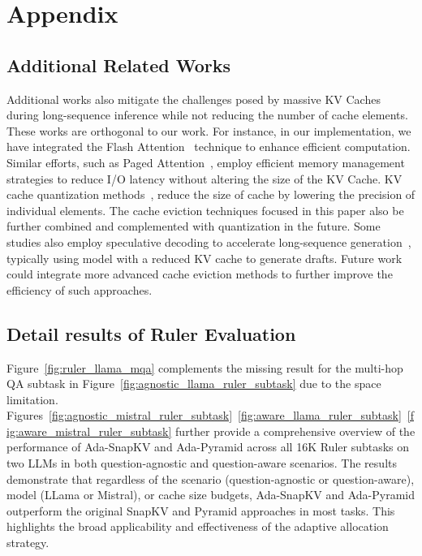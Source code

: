 \onecolumn
\newpage
{}
\appendix
\section{Appendix}
\subsection{Additional Related Works}
\label{apdx:additional_related}
Additional works also mitigate the challenges posed by massive KV Caches during long-sequence inference while not reducing the number of cache elements. These works are orthogonal to our work. For instance, in our implementation, we have integrated the Flash Attention~\cite{dao2022flashattention} technique to enhance efficient computation. Similar efforts, such as Paged Attention~\cite{kwon2023efficient}, employ efficient memory management strategies to reduce I/O latency without altering the size of the KV Cache.
KV cache quantization methods~\cite{yao2022zeroquant,liu2024kivi,dong2024qaq}, reduce the size of cache by lowering the precision of individual elements. The cache eviction techniques focused in this paper also be further combined and complemented with quantization in the future. 
Some studies also employ speculative decoding to accelerate long-sequence generation~\cite{sun2024triforce, yanglongspec, ji2025specvlm}, typically using model with a reduced KV cache to generate drafts. Future work could integrate more advanced cache eviction methods to further improve the efficiency of such approaches.




\subsection{Detail results of Ruler Evaluation}
\label{apdx:detail_ruler}
Figure~\ref{fig:ruler_llama_mqa} complements the missing result for the multi-hop QA subtask in Figure~\ref{fig:agnostic_llama_ruler_subtask} due to the space limitation. Figures~\ref{fig:agnostic_mistral_ruler_subtask}~\ref{fig:aware_llama_ruler_subtask}~\ref{fig:aware_mistral_ruler_subtask} further provide a comprehensive overview of the performance of Ada-SnapKV and Ada-Pyramid across all 16K Ruler subtasks on two LLMs in both question-agnostic and question-aware scenarios. The results demonstrate that regardless of the scenario (question-agnostic or question-aware), model (LLama or Mistral), or cache size budgets, Ada-SnapKV and Ada-Pyramid outperform the original SnapKV and Pyramid approaches in most tasks. This highlights the broad applicability and effectiveness of the adaptive allocation strategy.

